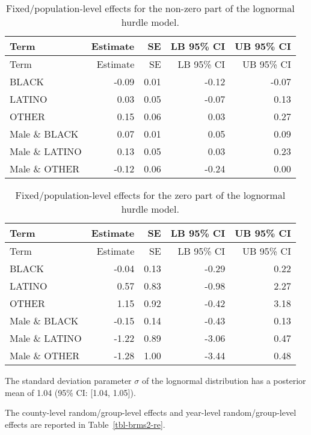 \documentclass[
  letterpaper,
  DIV=11,
  numbers=noendperiod]{scrartcl}
\begin{document}
\hypertarget{tbl-brms-hurdle-model-summary-2-racesex}{}
\begin{longtable}[]{@{}lrrrr@{}}
\caption{\label{tbl-brms-hurdle-model-summary-2-racesex}Fixed/population-level
effects for the non-zero part of the lognormal hurdle
model.}\tabularnewline
\toprule\noalign{}
Term & Estimate & SE & LB 95\% CI & UB 95\% CI \\
\midrule\noalign{}
\endfirsthead
\toprule\noalign{}
Term & Estimate & SE & LB 95\% CI & UB 95\% CI \\
\midrule\noalign{}
\endhead
\bottomrule\noalign{}
\endlastfoot
BLACK & -0.09 & 0.01 & -0.12 & -0.07 \\
LATINO & 0.03 & 0.05 & -0.07 & 0.13 \\
OTHER & 0.15 & 0.06 & 0.03 & 0.27 \\
Male \& BLACK & 0.07 & 0.01 & 0.05 & 0.09 \\
Male \& LATINO & 0.13 & 0.05 & 0.03 & 0.23 \\
Male \& OTHER & -0.12 & 0.06 & -0.24 & 0.00 \\
\end{longtable}

\hypertarget{tbl-brms-hurdle-model-summary-2-zero-racesex}{}
\begin{longtable}[]{@{}lrrrr@{}}
\caption{\label{tbl-brms-hurdle-model-summary-2-zero-racesex}Fixed/population-level
effects for the zero part of the lognormal hurdle model.}\tabularnewline
\toprule\noalign{}
Term & Estimate & SE & LB 95\% CI & UB 95\% CI \\
\midrule\noalign{}
\endfirsthead
\toprule\noalign{}
Term & Estimate & SE & LB 95\% CI & UB 95\% CI \\
\midrule\noalign{}
\endhead
\bottomrule\noalign{}
\endlastfoot
BLACK & -0.04 & 0.13 & -0.29 & 0.22 \\
LATINO & 0.57 & 0.83 & -0.98 & 2.27 \\
OTHER & 1.15 & 0.92 & -0.42 & 3.18 \\
Male \& BLACK & -0.15 & 0.14 & -0.43 & 0.13 \\
Male \& LATINO & -1.22 & 0.89 & -3.06 & 0.47 \\
Male \& OTHER & -1.28 & 1.00 & -3.44 & 0.48 \\
\end{longtable}

The standard deviation parameter \(\sigma\) of the lognormal
distribution has a posterior mean of 1.04 (95\% CI: {[}1.04, 1.05{]}).

The county-level random/group-level effects and year-level
random/group-level effects are reported in Table~\ref{tbl-brms2-re}.
\end{document}
